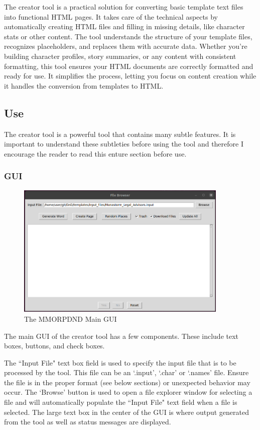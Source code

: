The creator tool is a practical solution for converting basic template text files into functional HTML pages. It takes care of the technical aspects by automatically creating HTML files and filling in missing details, like character stats or other content. The tool understands the structure of your template files, recognizes placeholders, and replaces them with accurate data. Whether you're building character profiles, story summaries, or any content with consistent formatting, this tool ensures your HTML documents are correctly formatted and ready for use. It simplifies the process, letting you focus on content creation while it handles the conversion from templates to HTML.

\subsection{Use}

The creator tool is a powerful tool that contains many subtle features. It is important to understand these subtleties before using the tool and therefore I encourage the reader to read this enture section before use. 

\subsubsection{GUI}

\begin{figure}[h]
	\centering
	\includegraphics[width=0.9\textwidth]{images/creator_gui.png}
	\caption{The MMORPDND Main GUI}
	\label{fig:creator_gui}
\end{figure}

The main GUI of the creator tool has a few components. These include text boxes, buttons, and check boxes. 

The ``Input File" text box field is used to specify the input file that is to be processed by the tool. This file can be an `.input', `.char' or `.names' file. Ensure the file is in the proper format (see below sections) or unexpected behavior may occur. The `Browse' button is used to open a file explorer window for selecting a file and will automatically populate the ``Input File" text field when a file is selected. The large text box in the center of the GUI is where output generated from the tool as well as status messages are displayed.

